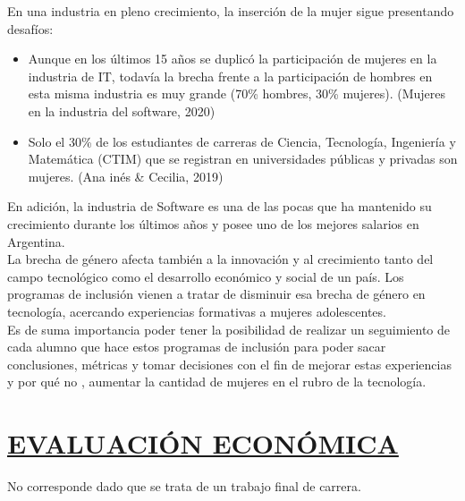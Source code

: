 En una industria en pleno crecimiento, la inserción de la mujer sigue presentando desafíos:
\begin{itemize}
	\item Aunque en los últimos 15 años se duplicó la participación de mujeres en la industria de IT, todavía la brecha frente a la participación de hombres en esta misma industria es muy grande (70\% hombres, 30\% mujeres).  \textbf{\cite{DuplMujeres}}(Mujeres en la industria del software, 2020)
	\item Solo el 30\% de los estudiantes de carreras de Ciencia, Tecnología, Ingeniería y Matemática (CTIM) que se registran en universidades públicas y privadas son mujeres. \textbf{\cite{MujeresCtim}}(Ana inés \& Cecilia, 2019)\\
\end{itemize}

En adición, la industria de Software es una de las pocas que ha mantenido su crecimiento durante los últimos años y posee uno de los mejores salarios en Argentina.\\

La brecha de género afecta también a la innovación y al crecimiento tanto del campo tecnológico como el desarrollo económico y social de un país. Los programas de inclusión vienen a tratar de disminuir esa brecha de género en tecnología, acercando experiencias formativas a mujeres adolescentes.\\

Es de suma importancia poder tener la posibilidad de realizar un seguimiento de cada alumno que hace estos programas de inclusión para poder sacar conclusiones, métricas y tomar decisiones con el fin de mejorar estas experiencias y por qué no , aumentar la cantidad de mujeres en el rubro de la tecnología. \\

\section*{\underline{EVALUACIÓN ECONÓMICA}}
No corresponde dado que se trata de un trabajo final de carrera.
